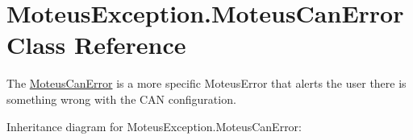 \hypertarget{classMoteusException_1_1MoteusCanError}{}\section{Moteus\+Exception.\+Moteus\+Can\+Error Class Reference}
\label{classMoteusException_1_1MoteusCanError}


The \hyperlink{classMoteusException_1_1MoteusCanError}{Moteus\+Can\+Error} is a more specific Moteus\+Error that alerts the user there is something wrong with the C\+AN configuration.  




Inheritance diagram for Moteus\+Exception.\+Moteus\+Can\+Error\+:
